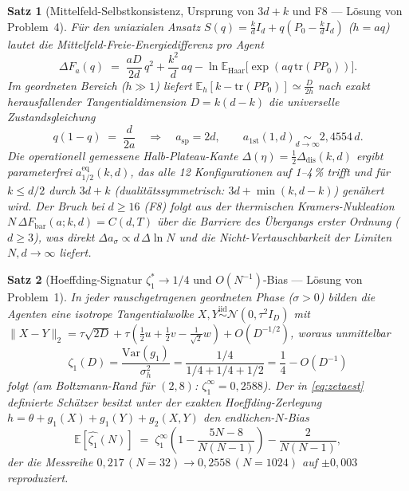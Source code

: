 \documentclass[11pt,a4paper]{article}
\newtheorem{satz}{Satz}
\theoremstyle{remark}
\newcommand{\E}{\mathbb{E}}
\begin{document}
\begin{satz}[Mittelfeld-Selbstkonsistenz, Ursprung von $3d+k$ und F8 --- Lösung von Problem~4]\label{thm:3dk}
Für den uniaxialen Ansatz $S(q)=\frac{k}{d}I_d+q(P_0-\frac{k}{d}I_d)$ ($h=aq$)
lautet die Mittelfeld-Freie-Energiedifferenz pro Agent
\[
\Delta F_a(q)\;=\;\frac{aD}{2d}\,q^2+\frac{k^2}{d}\,aq-\ln\E_{\mathrm{Haar}}\!\big[\exp(aq\,\mathrm{tr}(PP_0))\big].
\]
Im geordneten Bereich ($h\gg1$) liefert $\E_h[k-\mathrm{tr}(PP_0)]\simeq\frac{D}{2h}$
nach exakt herausfallender Tangentialdimension $D=k(d-k)$ die universelle
Zustandsgleichung
\begin{equation}\label{eq:selfcons}
q(1-q)\;=\;\frac{d}{2a}
\quad\Longrightarrow\quad
a_{\mathrm{sp}}=2d,\qquad
a_{\mathrm{1st}}(1,d)\underset{d\to\infty}{\sim}2{,}4554\,d.
\end{equation}
Die operationell gemessene Halb-Plateau-Kante $\Delta(\eta)=\frac12\Delta_{\mathrm{dis}}(k,d)$
ergibt parameterfrei $a_{1/2}^{\mathrm{eq}}(k,d)$, das alle 12 Konfigurationen
auf 1--4\,\% trifft und für $k\le d/2$ durch $3d+k$ (dualitätssymmetrisch:
$3d+\min(k,d-k)$) genähert wird. Der Bruch bei $d\ge16$ (F8) folgt aus der
thermischen Kramers-Nukleation $N\,\Delta F_{\mathrm{bar}}(a;k,d)=C(d,T)$ über
die Barriere des Übergangs erster Ordnung ($d\ge3$), was direkt
$\Delta a_\sigma\propto d\,\Delta\ln N$ und die Nicht-Vertauschbarkeit der
Limiten $N,d\to\infty$ liefert.
\end{satz}

\begin{satz}[Hoeffding-Signatur $\zeta_1^\ast\to1/4$ und $O(N^{-1})$-Bias --- Lösung von Problem~1]\label{thm:zeta1}
In jeder rauschgetragenen geordneten Phase ($\sigma>0$) bilden die Agenten eine
isotrope Tangentialwolke $X,Y\stackrel{\mathrm{iid}}{\sim}\mathcal N(0,\tau^2 I_D)$
mit $\|X-Y\|_2=\tau\sqrt{2D}+\tau(\frac12 u+\frac12 v-\frac{1}{\sqrt2}w)+O(D^{-1/2})$,
woraus unmittelbar
\[
\zeta_1(D)=\frac{\mathrm{Var}(g_1)}{\sigma_h^2}=\frac{1/4}{1/4+1/4+1/2}=\frac14-O(D^{-1})
\]
folgt (am Boltzmann-Rand für $(2,8)$: $\zeta_1^\infty=0{,}2588$). Der in
\eqref{eq:zetaest} definierte Schätzer besitzt unter der exakten
Hoeffding-Zerlegung $h=\theta+g_1(X)+g_1(Y)+g_2(X,Y)$ den endlichen-$N$-Bias
\begin{equation}\label{eq:zetabias}
\E[\widehat{\zeta_1}(N)]
\;=\;\zeta_1^\infty\left(1-\frac{5N-8}{N(N-1)}\right)-\frac{2}{N(N-1)},
\end{equation}
der die Messreihe $0{,}217\,(N{=}32)\to0{,}2558\,(N{=}1024)$ auf $\pm0{,}003$ reproduziert.
\end{satz}
\end{document}
